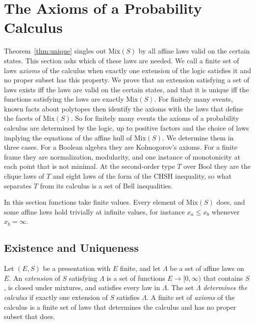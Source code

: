 \section{The Axioms of a Probability Calculus}
\label{sec:axioms}

Theorem~\ref{thm:unique} singles out $\mathrm{Mix}(S)$ by all affine laws
valid on the certain states. This section asks which of these laws are
needed. We call a finite set of laws \emph{axioms} of the calculus when
exactly one extension of the logic satisfies it and no proper subset has
this property. We prove that an extension satisfying a set of laws exists
iff the laws are valid on the certain states, and that it is unique iff
the functions satisfying the laws are exactly $\mathrm{Mix}(S)$. For
finitely many events, known facts about polytopes then identify the axioms
with the laws that define the facets of $\mathrm{Mix}(S)$. So for finitely
many events the axioms of a probability calculus are determined by the
logic, up to positive factors and the choice of laws implying the
equations of the affine hull of $\mathrm{Mix}(S)$. We determine them in three cases. For a Boolean
algebra they are Kolmogorov's axioms. For a finite frame they are
normalization, modularity, and one instance of monotonicity at each point
that is not minimal. At the second-order type $T$ over $\mathrm{Bool}$
they are the clique laws of $T$ and eight laws of the form of the CHSH
inequality, so what separates $T$ from its calculus is a set of Bell
inequalities.

In this section functions take finite values. Every element of
$\mathrm{Mix}(S)$ does, and some affine laws hold trivially at infinite
values, for instance $x_a \le x_b$ whenever $x_b = \infty$.

\subsection{Existence and Uniqueness}
\label{sec:axioms-unique}

\begin{definition}
\label{def:axioms}
Let $(E, S)$ be a presentation with $E$ finite, and let $\Lambda$ be a
set of affine laws on $E$. An \emph{extension} of $S$ satisfying
$\Lambda$ is a set of functions $E \to [0, \infty)$ that contains $S$,
is closed under mixtures, and satisfies every law in $\Lambda$. The set
$\Lambda$ \emph{determines the calculus} if exactly one extension of $S$
satisfies $\Lambda$. A finite set of \emph{axioms} of the calculus is a
finite set of laws that determines the calculus and has no proper subset
that does.
\end{definition}

